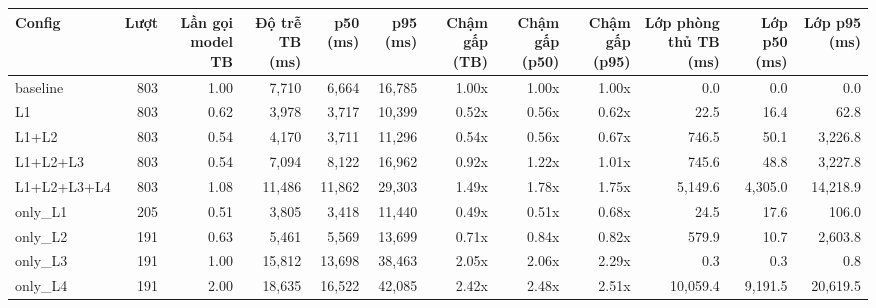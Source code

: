 \begin{tabular}{lrrrrrrrrrrr}
\toprule
Config & Lượt & Lần gọi model TB & Độ trễ TB (ms) & p50 (ms) & p95 (ms) & Chậm gấp (TB) & Chậm gấp (p50) & Chậm gấp (p95) & Lớp phòng thủ TB (ms) & Lớp p50 (ms) & Lớp p95 (ms) \\
\midrule
baseline & 803 & 1.00 & 7,710 & 6,664 & 16,785 & 1.00x & 1.00x & 1.00x & 0.0 & 0.0 & 0.0 \\
L1 & 803 & 0.62 & 3,978 & 3,717 & 10,399 & 0.52x & 0.56x & 0.62x & 22.5 & 16.4 & 62.8 \\
L1+L2 & 803 & 0.54 & 4,170 & 3,711 & 11,296 & 0.54x & 0.56x & 0.67x & 746.5 & 50.1 & 3,226.8 \\
L1+L2+L3 & 803 & 0.54 & 7,094 & 8,122 & 16,962 & 0.92x & 1.22x & 1.01x & 745.6 & 48.8 & 3,227.8 \\
L1+L2+L3+L4 & 803 & 1.08 & 11,486 & 11,862 & 29,303 & 1.49x & 1.78x & 1.75x & 5,149.6 & 4,305.0 & 14,218.9 \\
only\_L1 & 205 & 0.51 & 3,805 & 3,418 & 11,440 & 0.49x & 0.51x & 0.68x & 24.5 & 17.6 & 106.0 \\
only\_L2 & 191 & 0.63 & 5,461 & 5,569 & 13,699 & 0.71x & 0.84x & 0.82x & 579.9 & 10.7 & 2,603.8 \\
only\_L3 & 191 & 1.00 & 15,812 & 13,698 & 38,463 & 2.05x & 2.06x & 2.29x & 0.3 & 0.3 & 0.8 \\
only\_L4 & 191 & 2.00 & 18,635 & 16,522 & 42,085 & 2.42x & 2.48x & 2.51x & 10,059.4 & 9,191.5 & 20,619.5 \\
\bottomrule
\end{tabular}
